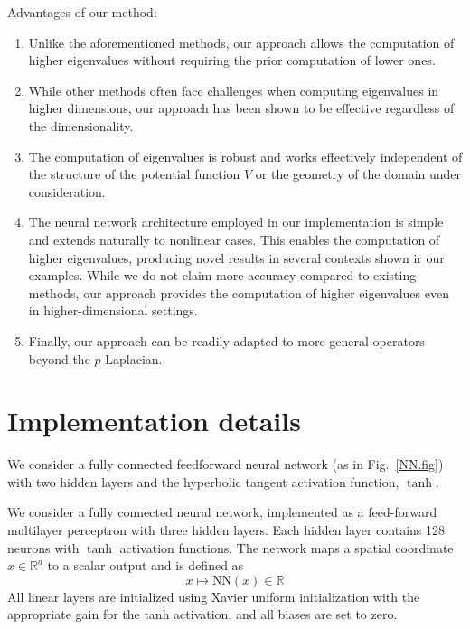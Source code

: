 \documentclass[reprint,superscriptaddress,aps,prl]{revtex4-2}
\newcommand{\R}{\mathbb{R}}
\begin{document}
Advantages of our method:
\begin{enumerate}
\item  Unlike the aforementioned methods, our approach allows the computation of higher eigenvalues without requiring the prior computation of lower ones.


\item While other methods often face challenges when computing eigenvalues in higher dimensions, our approach has been shown to be effective regardless of the dimensionality.

\item The computation of eigenvalues is robust and works effectively independent of the structure of the potential function $V$ or the geometry of the domain under consideration.

\item The neural network architecture employed in our implementation is simple and extends naturally to nonlinear cases. This enables the computation of higher eigenvalues, producing novel results in several contexts shown ir our examples. While we do not claim more accuracy compared to existing methods, our approach provides the computation of higher eigenvalues even in higher-dimensional settings.

 
\item Finally, our approach can be readily adapted to more general operators beyond the $p$-Laplacian.
\end{enumerate}


\normalcolor

\section{Implementation details}

We consider a fully connected feedforward neural network (as in Fig.~\ref{NN.fig}) with two hidden layers and the hyperbolic tangent activation function, $\tanh$. 

 


We consider a  fully connected neural network,  implemented as a feed-forward multilayer perceptron with three hidden layers. Each hidden layer contains 128 neurons with $\tanh$ activation functions. The network maps a  spatial coordinate $x\in \R^d$ to a scalar output and is defined as
$$
x \mapsto \text{NN}(x) \in \mathbb{R}
$$
All linear layers are initialized using Xavier uniform initialization with the appropriate gain for the tanh activation, and all biases are set to zero.
\end{document}
